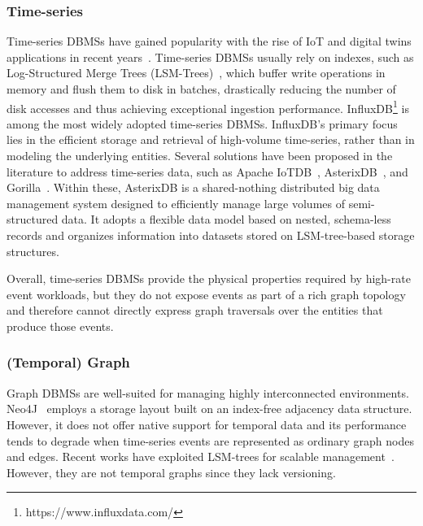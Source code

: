 \subsubsection{Time-series}
Time-series DBMSs have gained popularity with the rise of IoT and digital twins applications in recent years~\cite{DBLP:journals/tkde/JensenPT17}.
Time-series DBMSs usually rely on indexes, such as Log-Structured Merge Trees (LSM-Trees)~\cite{DBLP:journals/acta/ONeilCGO96}, which buffer write operations in memory and flush them to disk in batches, drastically reducing the number of disk accesses and thus achieving exceptional ingestion performance.
InfluxDB\footnote{https://www.influxdata.com/} is among the most widely adopted time-series DBMSs.
InfluxDB's primary focus lies in the efficient storage and retrieval of high-volume time-series, rather than in modeling the underlying entities.
Several solutions have been proposed in the literature to address time-series data, such as Apache IoTDB~\cite{DBLP:journals/pvldb/0018HQ00MFZ0ZKJ20}, AsterixDB~\cite{DBLP:journals/pvldb/AlsubaieeAABBBCCCFGGHKLLOOPTVWW14}, and Gorilla~\cite{DBLP:journals/pvldb/PelkonenFCHMTV15}.
Within these, AsterixDB is a shared-nothing distributed big data management system designed to efficiently manage large volumes of semi-structured data.
It adopts a flexible data model based on nested, schema-less records and organizes information into datasets stored on LSM-tree-based storage structures.

Overall, time-series DBMSs provide the physical properties required by high-rate event workloads, but they do not expose events as part of a rich graph topology and therefore cannot directly express graph traversals over the entities that produce those events.

\subsubsection{(Temporal) Graph}
Graph DBMSs are well-suited for managing highly interconnected environments.
Neo4J~\cite{Neo4J2025} employs a storage layout built on an index-free adjacency data structure.
However, it does not offer native support for temporal data and its performance tends to degrade when time-series events are represented as ordinary graph nodes and edges.
Recent works have exploited LSM-trees for scalable management~\cite{DBLP:journals/pacmmod/MoLWL25,DBLP:journals/corr/abs-2411-06392}.
However, they are not temporal graphs since they lack versioning.

